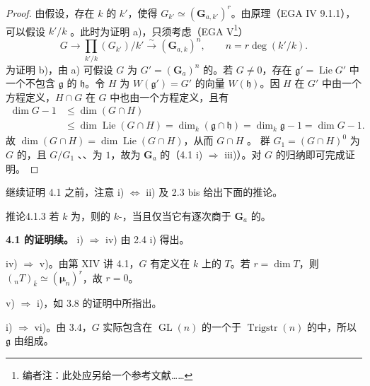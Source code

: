\begin{proof}
由假设，存在 $k$ 的 $k'$，使得 $G_{k'}\simeq(\mathbf G_{a,k'})^r$。由原理（EGA IV 9.1.1），可以假设 $k'/k$ 。此时为证明 a)，只须考虑（EGA V\footnote{编者注：此处应另给一个参考文献……}）
\[G\longrightarrow\prod_{k'/k}(G_{k'})/k'\xrightarrow{\sim}(\mathbf G_{a,k})^n,\qquad n=r\deg(k'/k).\]
为证明 b)，由 a) 可假设 $G$ 为 $G'=(\mathbf G_a)^n$ 的。若 $G\ne0$，存在 $\mathfrak g'=\operatorname{Lie}G'$ 中一个不包含 $\mathfrak g$ 的 $\mathfrak h$。令 $H$ 为 $W(\mathfrak g')=G'$ 的向量 $W(\mathfrak h)$。因 $H$ 在 $G'$ 中由一个方程定义，$H\cap G$ 在 $G$ 中也由一个方程定义，且有
\[
\begin{aligned}
\dim G-1&\leq\dim(G\cap H)\\
&\leq\dim\operatorname{Lie}(G\cap H)=\dim_k(\mathfrak g\cap\mathfrak h)
=\dim_k\mathfrak g-1=\dim G-1.
\end{aligned}
\]
故 $\dim(G\cap H)=\dim\operatorname{Lie}(G\cap H)$，从而 $G\cap H$ 。
群 $G_1=(G\cap H)^0$ 为 $G$ 的，且 $G/G_1$ 、、为 $1$，故为 $\mathbf G_a$ 的（4.1 i) $\Rightarrow$ iii)）。对 $G$ 的归纳即可完成证明。
\end{proof}
继续证明 4.1 之前，注意 i) $\Leftrightarrow$ ii) 及 2.3 bis 给出下面的推论。
\begin{SGAresult}{推论}{4.1.3}
若 $k$ 为，则的 $k$-，当且仅当它有逐次商于 $\mathbf G_a$ 的。
\end{SGAresult}
\textbf{4.1 的证明续。}
i) $\Rightarrow$ iv) 由 2.4 i) 得出。

iv) $\Rightarrow$ v)。由第 XIV 讲 4.1，$G$ 有定义在 $k$ 上的 $T$。若 $r=\dim T$，则 $({}_nT)_{\overline k}\simeq(\boldsymbol\mu_n)^r$，故 $r=0$。

v) $\Rightarrow$ i)，如 3.8 的证明中所指出。

i) $\Rightarrow$ vi)。由 3.4，$G$ 实际包含在 $\operatorname{GL}(n)$ 的一个于 $\operatorname{Trigstr}(n)$ 的中，所以 $\mathfrak g$ 由组成。

